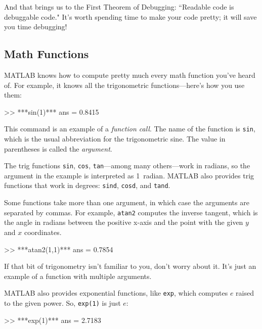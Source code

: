 
And that brings us to the First Theorem of Debugging: ``Readable code is debuggable code."
It's worth spending time to make your code pretty; it will save
you time \mbox{debugging}!


\subsection{Math Functions}

MATLAB knows how to compute pretty much every math function you've
heard of. For example, it knows all the trigonometric functions---here's how you
use them:


\begin{code}
>> ***sin(1)***
ans = 0.8415
\end{code}

This command is an example of a \emph{function call}.  The name of the
function is \lstinline{sin}, which is the usual abbreviation for the
trigonometric sine.  The value in parentheses is called the \emph{argument}.
%
%

The trig functions \lstinline{sin}, \lstinline{cos}, \lstinline{tan}---among many
others---work in radians, so the argument in the example is interpreted as 1~radian.
MATLAB also provides trig functions that work in degrees: \lstinline{sind}, \lstinline{cosd}, and \lstinline{tand}.

Some functions take more than one argument, in which case the arguments are
separated by commas.  For example, \lstinline{atan2} computes the inverse
tangent, which is the angle in radians between the positive x-axis and
the point with the given $y$ and $x$ coordinates.

\begin{code}
>> ***atan2(1,1)***
ans = 0.7854
\end{code}

If that bit of trigonometry isn't familiar to you, don't worry about
it.  It's just an example of a function with multiple arguments.


MATLAB also provides exponential functions, like \lstinline{exp}, which computes $e$ raised to the given power.  So, \lstinline{exp(1)} is just $e$:

\begin{code}
>> ***exp(1)***
ans = 2.7183
\end{code}

